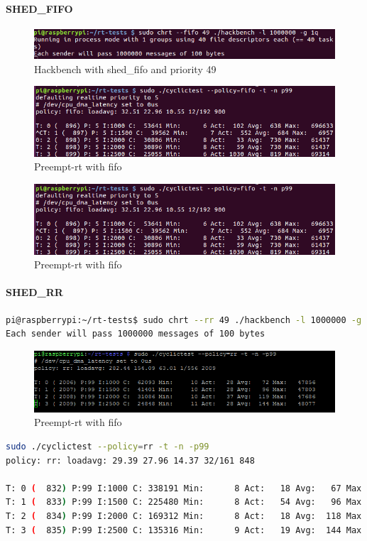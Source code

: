 \documentclass[10pt,a4paper]{article}
\begin{document}
\paragraph{SHED\_FIFO}
\begin{figure}[H]
\includegraphics[width=16cm]{Hackbench2.png}
\caption{Hackbench with shed\_fifo and priority 49}
\end{figure}
\begin{figure}[H]
\includegraphics[width=16cm]{Preempt-Fifo-WithHackbench2.png}
\caption{Preempt-rt with fifo}
\end{figure}
\begin{figure}[H]
\includegraphics[width=16cm]{Preempt-Fifo-WithHackbench2.png}
\caption{Preempt-rt with fifo}
\end{figure}
\paragraph{SHED\_RR}
\begin{lstlisting}[language=bash,caption={Hackbench with shed\_rr and priority 49}]
pi@raspberrypi:~/rt-tests$ sudo chrt --rr 49 ./hackbench -l 1000000 -g 1q                     
Each sender will pass 1000000 messages of 100 bytes
\end{lstlisting}
\begin{figure}[H]
\includegraphics[width=16cm]{Preempt-RR-WithHackbench.png}
\caption{Preempt-rt with fifo}
\end{figure}
\begin{lstlisting}[language=bash,caption={Volontary kernel}]
sudo ./cyclictest --policy=rr -t -n -p99
policy: rr: loadavg: 29.39 27.96 14.37 32/161 848          

T: 0 (  832) P:99 I:1000 C: 338191 Min:      8 Act:   18 Avg:   67 Max:   49660
T: 1 (  833) P:99 I:1500 C: 225480 Min:      8 Act:   54 Avg:   96 Max:   49563
T: 2 (  834) P:99 I:2000 C: 169312 Min:      8 Act:   18 Avg:  118 Max:   49511
T: 3 (  835) P:99 I:2500 C: 135316 Min:      9 Act:   19 Avg:  144 Max:   47964
\end{lstlisting}
\end{document}
